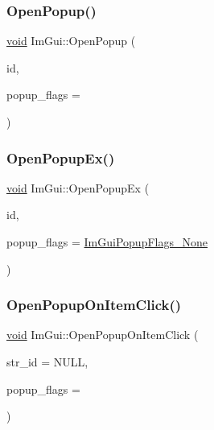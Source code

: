 \subsubsection{\texorpdfstring{Open\+Popup()}{OpenPopup()}\hspace{0.1cm}{\footnotesize\ttfamily [2/2]}}
{\footnotesize\ttfamily \hyperlink{imgui__impl__opengl3__loader_8h_ac668e7cffd9e2e9cfee428b9b2f34fa7}{void} Im\+Gui\+::\+Open\+Popup (\begin{DoxyParamCaption}\item[{Im\+Gui\+ID}]{id,  }\item[{Im\+Gui\+Popup\+Flags}]{popup\+\_\+flags = {} }\end{DoxyParamCaption})}

\mbox{\label{namespaceImGui_ac1570338b44e1f1311055db7ae41c47b}} 
\subsubsection{\texorpdfstring{Open\+Popup\+Ex()}{OpenPopupEx()}}
{\footnotesize\ttfamily \hyperlink{imgui__impl__opengl3__loader_8h_ac668e7cffd9e2e9cfee428b9b2f34fa7}{void} Im\+Gui\+::\+Open\+Popup\+Ex (\begin{DoxyParamCaption}\item[{Im\+Gui\+ID}]{id,  }\item[{Im\+Gui\+Popup\+Flags}]{popup\+\_\+flags = {\ttfamily \hyperlink{imgui_8h_a555744cd1c43214047697439a08a086eafa4c839530050d037b6825b7d3e00d5f}{Im\+Gui\+Popup\+Flags\+\_\+\+None}} }\end{DoxyParamCaption})}

\mbox{\label{namespaceImGui_a3811834876930efd5cb08a25d8c022d0}} 
\subsubsection{\texorpdfstring{Open\+Popup\+On\+Item\+Click()}{OpenPopupOnItemClick()}}
{\footnotesize\ttfamily \hyperlink{imgui__impl__opengl3__loader_8h_ac668e7cffd9e2e9cfee428b9b2f34fa7}{void} Im\+Gui\+::\+Open\+Popup\+On\+Item\+Click (\begin{DoxyParamCaption}\item[{const char $\ast$}]{str\+\_\+id = {\ttfamily NULL},  }\item[{Im\+Gui\+Popup\+Flags}]{popup\+\_\+flags = {} }\end{DoxyParamCaption})}

